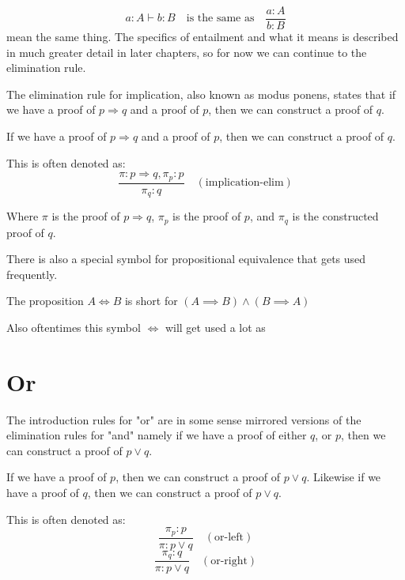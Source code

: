 \begin{equation*}
    a : A \vdash b : B \quad \text{is the same as} \quad \frac{a : A}{b : B}
\end{equation*}
mean the same thing. The specifics of entailment and what it means is described in much greater detail in later chapters, so for now we can continue to the elimination rule.

The elimination rule for implication, also known as modus ponens, states that if we have a proof of $p \Rightarrow q$ and a proof of $p$, then we can construct a proof of $q$.

\begin{definition}
    If we have a proof of $p \Rightarrow q$ and a proof of $p$, then we can construct a proof of $q$.
\end{definition}

This is often denoted as:
\begin{equation*}
    \frac{\pi : p \Rightarrow q, \pi_p : p}{\pi_q : q}\quad(\text{implication-elim})
\end{equation*}

Where $\pi$ is the proof of $p \Rightarrow q$, $\pi_p$ is the proof of $p$, and $\pi_q$ is the constructed proof of $q$.

There is also a special symbol for propositional equivalence that gets used frequently.
\begin{definition}
    The proposition $A \iff B$ is short for $(A \implies B) \land (B \implies A)$
\end{definition}
Also oftentimes this symbol $\iff$ will get used a lot as


\section{Or}


The introduction rules for "or" are in some sense mirrored versions of the elimination rules for "and" namely if we have a proof of either $q$, or $p$, then we can construct a proof of $p \lor q$.

\begin{definition}[Or Introduction]
    If we have a proof of $p$, then we can construct a proof of $p \lor q$. Likewise if we have a proof of $q$, then we can construct a proof of $p \lor q$.
\end{definition}

This is often denoted as:
\begin{equation*}
    \frac{\pi_p : p}{\pi : p \lor q}\quad(\text{or-left})
\end{equation*}
\begin{equation*}
    \frac{\pi_q : q}{\pi : p \lor q}\quad(\text{or-right})
\end{equation*}

